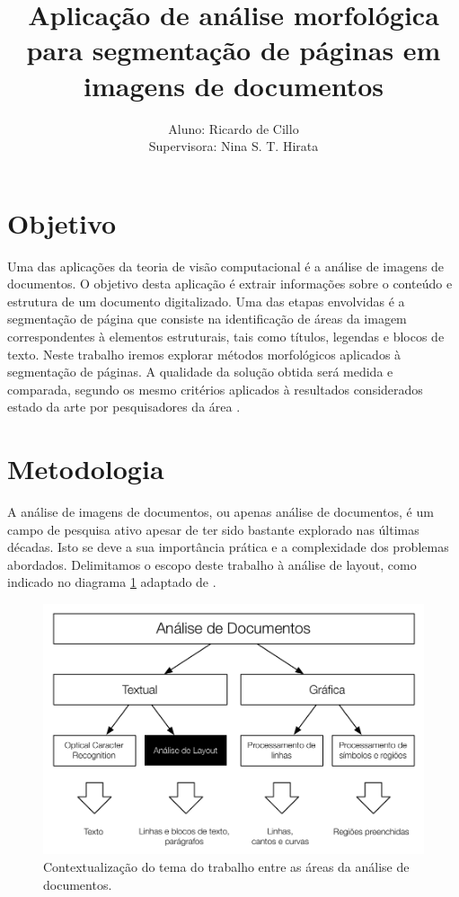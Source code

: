 \documentclass[a4paper,11pt]{article}
\title{Aplicação de análise morfológica para segmentação de páginas em imagens de documentos}
\author{ Aluno: Ricardo de Cillo \\ Supervisora: Nina S. T. Hirata }
\date{}
\begin{document}
\maketitle


\section{Objetivo}
	Uma das aplicações da teoria de visão computacional é a análise de imagens de documentos. O objetivo desta aplicação é extrair informações sobre o conteúdo e estrutura de um documento digitalizado. Uma das etapas envolvidas é a segmentação de página que consiste na identificação de áreas da imagem correspondentes à elementos estruturais, tais como títulos, legendas e blocos de texto. Neste trabalho iremos explorar métodos morfológicos aplicados à segmentação de páginas. A qualidade da solução obtida será medida e comparada, segundo os mesmo critérios aplicados à resultados considerados estado da arte por pesquisadores da área \cite{10.1109/ICDAR.2007.207}.

\section{Metodologia}

A análise de imagens de documentos, ou apenas análise de documentos, é um campo de pesquisa ativo apesar de ter sido bastante explorado nas últimas décadas. Isto se deve a sua importância prática e a complexidade dos problemas abordados. Delimitamos o escopo deste trabalho à análise de layout, como indicado no diagrama \ref{fig:context1} adaptado de \cite{Kasturi_OGorman_Govindaraju_2002}.

\begin{figure}[htb!]
\begin{center}
\includegraphics{assets/document_processing_areas_hierarquies.pdf}
\end{center}
\caption{Contextualização do tema do trabalho entre as áreas da análise de documentos.}
\label{fig:context1}
\end{figure}
\end{document}
